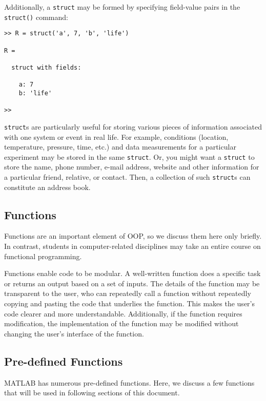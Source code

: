 Additionally, a \texttt{struct} may be formed by specifying field-value pairs in the \texttt{struct()} command:
\begin{lstlisting}[style=Matlab-editor]
>> R = struct('a', 7, 'b', 'life')

R = 

  struct with fields:

    a: 7
    b: 'life'

>> 
\end{lstlisting}


\texttt{struct}s are particularly useful for storing various pieces of information associated with one system or event in real life. For example, conditions (location, temperature, pressure, time, etc.) and data measurements for a particular experiment may be stored in the same \texttt{struct}. Or, you might want a \texttt{struct} to store the name, phone number, e-mail address, website and other information for a particular friend, relative, or contact. Then, a collection of such \texttt{struct}s can constitute an address book.

\subsection{Functions}
Functions are an important element of OOP, so we discuss them here only briefly. In contrast, students in computer-related disciplines may take an entire course on functional programming.

Functions enable code to be modular. A well-written function does a specific task or returns an output based on a set of inputs. The details of the function may be transparent to the user, who can repeatedly call a function without repeatedly copying and pasting the code that underlies the function. This makes the user's code clearer and more understandable. Additionally, if the function requires modification, the implementation of the function may be modified without changing the user's interface of the function.

\subsection{Pre-defined Functions}
MATLAB has numerous pre-defined functions. Here, we discuss a few functions that will be used in following sections of this document.

